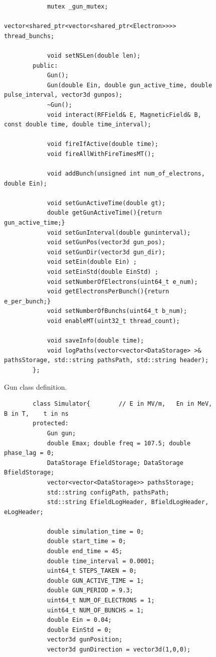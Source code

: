 \documentclass[a4paper,oneside,12pt]{report}
\numberwithin{equation}{chapter}
\begin{document}
{\begin{figure}[H]
\begin{verbatim}
            mutex _gun_mutex; 
            vector<shared_ptr<vector<shared_ptr<Electron>>>> thread_bunchs;

            void setNSLen(double len);
        public:
            Gun();
            Gun(double Ein, double gun_active_time, double pulse_interval, vector3d gunpos);
            ~Gun();
            void interact(RFField& E, MagneticField& B, const double time, double time_interval);

            void fireIfActive(double time);
            void fireAllWithFireTimesMT();
            
            void addBunch(unsigned int num_of_electrons, double Ein);

            void setGunActiveTime(double gt);
            double getGunActiveTime(){return gun_active_time;}
            void setGunInterval(double guninterval);
            void setGunPos(vector3d gun_pos);
            void setGunDir(vector3d gun_dir);
            void setEin(double Ein) ;
            void setEinStd(double EinStd) ;
            void setNumberOfElectrons(uint64_t e_num);
            void getElectronsPerBunch(){return e_per_bunch;}
            void setNumberOfBunchs(uint64_t b_num);
            void enableMT(uint32_t thread_count);
            
            void saveInfo(double time);
            void logPaths(vector<vector<DataStorage> >& pathsStorage, std::string pathsPath, std::string header);
        };
    \end{verbatim}
    \vspace{0pt}
    \caption{Gun class definition.}
    \label{fig:gun_class}
\end{figure}

\begin{figure}[H]
    \centering
    \begin{verbatim}
        class Simulator{        // E in MV/m,   En in MeV,   B in T,    t in ns
        protected:
            Gun gun;
            double Emax; double freq = 107.5; double phase_lag = 0; 
            DataStorage EfieldStorage; DataStorage BfieldStorage;
            vector<vector<DataStorage>> pathsStorage;
            std::string configPath, pathsPath;
            std::string EfieldLogHeader, BfieldLogHeader, eLogHeader;

            double simulation_time = 0;
            double start_time = 0;
            double end_time = 45;   
            double time_interval = 0.0001;
            uint64_t STEPS_TAKEN = 0;
            double GUN_ACTIVE_TIME = 1;         
            double GUN_PERIOD = 9.3;
            uint64_t NUM_OF_ELECTRONS = 1;
            uint64_t NUM_OF_BUNCHS = 1;
            double Ein = 0.04;
            double EinStd = 0;
            vector3d gunPosition;
            vector3d gunDirection = vector3d(1,0,0);


\end{verbatim}
\end{figure}}
\end{document}
